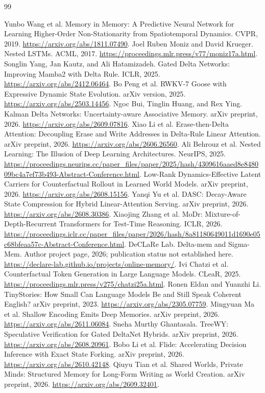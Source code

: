 \begin{thebibliography}{99}
\raggedright
{} Yunbo Wang et al. Memory in Memory: A Predictive Neural Network for Learning Higher-Order Non-Stationarity from Spatiotemporal Dynamics. CVPR, 2019.
\url{https://arxiv.org/abs/1811.07490}.
 Joel Ruben Moniz and David Krueger. Nested LSTMs. ACML, 2017.
\url{https://proceedings.mlr.press/v77/moniz17a.html}.
 Songlin Yang, Jan Kautz, and Ali Hatamizadeh. Gated Delta Networks: Improving Mamba2 with Delta Rule. ICLR, 2025.
\url{https://arxiv.org/abs/2412.06464}.
 Bo Peng et al. RWKV-7 Goose with Expressive Dynamic State Evolution. arXiv version, 2025.
\url{https://arxiv.org/abs/2503.14456}.
 Ngoc Bui, Tinglin Huang, and Rex Ying. Kalman Delta Networks: Uncertainty-aware Associative Memory. arXiv preprint, 2026.
\url{https://arxiv.org/abs/2609.07816}.
 Xiao Li et al. Erase-then-Delta Attention: Decoupling Erase and Write Addresses in Delta-Rule Linear Attention. arXiv preprint, 2026.
\url{https://arxiv.org/abs/2606.26560}.
 Ali Behrouz et al. Nested Learning: The Illusion of Deep Learning Architectures. NeurIPS, 2025.
\url{https://proceedings.neurips.cc/paper_files/paper/2025/hash/4309616aaed8e848009bc4a7ef73b493-Abstract-Conference.html}.
 Low-Rank Dynamics-Effective Latent Carriers for Counterfactual Rollout in Learned World Models. arXiv preprint, 2026.
\url{https://arxiv.org/abs/2608.15156}.
 Yanqi Yu et al. DASC: Decay-Aware State Compression for Hybrid Linear-Attention Serving. arXiv preprint, 2026.
\url{https://arxiv.org/abs/2608.30386}.
 Xiaojing Zhang et al. MoDr: Mixture-of-Depth-Recurrent Transformers for Test-Time Reasoning. ICLR, 2026.
\url{https://proceedings.iclr.cc/paper_files/paper/2026/hash/8a81180649011d1690e05c68bfeaa57c-Abstract-Conference.html}.
 DeCLaRe Lab. Delta-mem and Sigma-Mem. Author project page, 2026; publication status not established here.
\url{https://declare-lab.github.io/projects/online-memory/}.
 Ivi Chatzi et al. Counterfactual Token Generation in Large Language Models. CLeaR, 2025.
\url{https://proceedings.mlr.press/v275/chatzi25a.html}.
 Ronen Eldan and Yuanzhi Li. TinyStories: How Small Can Language Models Be and Still Speak Coherent English? arXiv preprint, 2023.
\url{https://arxiv.org/abs/2305.07759}.
 Mingyuan Ma et al. Shallow Encoding Emits Deep Memories.
arXiv preprint, 2026. \url{https://arxiv.org/abs/2611.06084}.
 Sneha Murthy Ghantasala. TreeWY: Speculative Verification
for Gated DeltaNet Hybrids. arXiv preprint, 2026.
\url{https://arxiv.org/abs/2608.20961}.
 Bobo Li et al. Flide: Accelerating Decision Inference with
Exact State Forking. arXiv preprint, 2026. \url{https://arxiv.org/abs/2610.42148}.
 Qiuyu Tian et al. Shared Worlds, Private Minds:
Structured Memory for Long-Form Writing as World Creation. arXiv preprint, 2026.
\url{https://arxiv.org/abs/2609.32401}.
\end{thebibliography}
